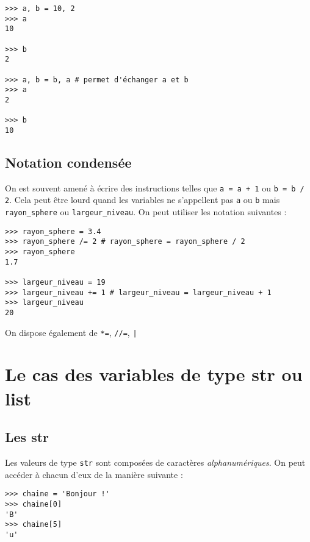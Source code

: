 \begin{pyc}\begin{verbatim}
>>> a, b = 10, 2
>>> a
10

>>> b
2

>>> a, b = b, a # permet d'échanger a et b
>>> a
2

>>> b
10

\end{verbatim}
\end{pyc}

\subsection{Notation condensée}
On est souvent amené à écrire des instructions telles que  \texttt{a = a + 1} ou \texttt{b = b / 2}. Cela peut être lourd quand les variables ne s'appellent
pas \texttt{a} ou \texttt{b} mais \texttt{rayon_sphere} ou \texttt{largeur_niveau}. On peut utiliser les notation suivantes :
\begin{pyc}\begin{verbatim}
>>> rayon_sphere = 3.4
>>> rayon_sphere /= 2 # rayon_sphere = rayon_sphere / 2
>>> rayon_sphere
1.7

>>> largeur_niveau = 19
>>> largeur_niveau += 1 # largeur_niveau = largeur_niveau + 1
>>> largeur_niveau
20
\end{verbatim}
\end{pyc}

On dispose également de \texttt{*=}, \texttt{//=}, \texttt|%

\section{Le cas des variables de type str ou list}

\subsection{Les str}

Les valeurs de type \texttt{str} sont composées de caractères \emph{alphanumériques}. On peut accéder à chacun d'eux de la manière suivante :
\begin{pyc}\begin{verbatim}
>>> chaine = 'Bonjour !'
>>> chaine[0]
'B'
>>> chaine[5]
'u'
\end{verbatim}
\end{pyc}

